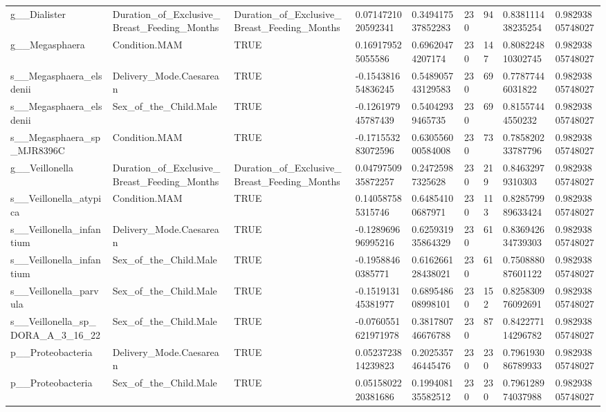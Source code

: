 \begin{longtable}{lllllllll}
g\_\_Dialister & Duration\_of\_Exclusive\_Breast\_Feeding\_Months & Duration\_of\_Exclusive\_Breast\_Feeding\_Months & 0.0714721020592341 & 0.349417537852283 & 230 & 94 & 0.838111438235254 & 0.98293805748027 \\
g\_\_Megasphaera & Condition.MAM & TRUE & 0.169179525055586 & 0.69620474207174 & 230 & 147 & 0.808224810302745 & 0.98293805748027 \\
s\_\_Megasphaera\_elsdenii & Delivery\_Mode.Caesarean & TRUE & -0.154381654836245 & 0.548905743129583 & 230 & 69 & 0.77877446031822 & 0.98293805748027 \\
s\_\_Megasphaera\_elsdenii & Sex\_of\_the\_Child.Male & TRUE & -0.126197945787439 & 0.54042939465735 & 230 & 69 & 0.81557444550232 & 0.98293805748027 \\
s\_\_Megasphaera\_sp\_MJR8396C & Condition.MAM & TRUE & -0.171553283072596 & 0.630556000584008 & 230 & 73 & 0.785820233787796 & 0.98293805748027 \\
g\_\_Veillonella & Duration\_of\_Exclusive\_Breast\_Feeding\_Months & Duration\_of\_Exclusive\_Breast\_Feeding\_Months & 0.0479750935872257 & 0.24725987325628 & 230 & 219 & 0.84632979310303 & 0.98293805748027 \\
s\_\_Veillonella\_atypica & Condition.MAM & TRUE & 0.140587585315746 & 0.64854100687971 & 230 & 113 & 0.828579989633424 & 0.98293805748027 \\
s\_\_Veillonella\_infantium & Delivery\_Mode.Caesarean & TRUE & -0.128969696995216 & 0.625931935864329 & 230 & 61 & 0.836942634739303 & 0.98293805748027 \\
s\_\_Veillonella\_infantium & Sex\_of\_the\_Child.Male & TRUE & -0.19588460385771 & 0.616266128438021 & 230 & 61 & 0.750888087601122 & 0.98293805748027 \\
s\_\_Veillonella\_parvula & Sex\_of\_the\_Child.Male & TRUE & -0.151913145381977 & 0.689548608998101 & 230 & 152 & 0.825830976092691 & 0.98293805748027 \\
s\_\_Veillonella\_sp\_DORA\_A\_3\_16\_22 & Sex\_of\_the\_Child.Male & TRUE & -0.0760551621971978 & 0.381780746676788 & 230 & 87 & 0.842277114296782 & 0.98293805748027 \\
p\_\_Proteobacteria & Delivery\_Mode.Caesarean & TRUE & 0.0523723814239823 & 0.202535746445476 & 230 & 230 & 0.796193086789933 & 0.98293805748027 \\
p\_\_Proteobacteria & Sex\_of\_the\_Child.Male & TRUE & 0.0515802220381686 & 0.199408135582512 & 230 & 230 & 0.796128974037988 & 0.98293805748027 \\

\end{longtable}
